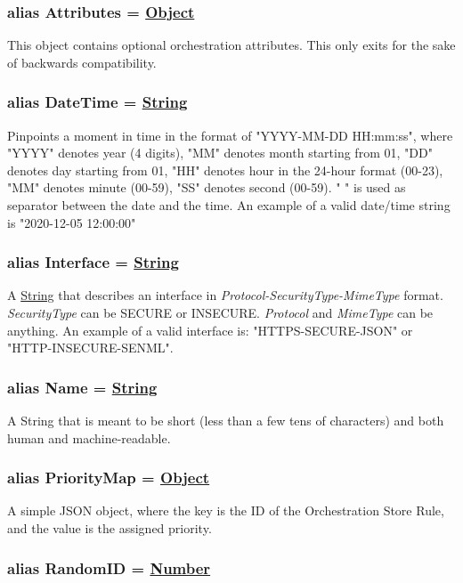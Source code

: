 \documentclass[a4paper]{arrowhead}
\newcommand{\pdef}[1]{{\textcolor{ArrowheadGrey}{#1 \label{sec:model:primitives:#1} \label{sec:model:primitives:#1s}}}}
\newcommand{\pref}[1]{{\textcolor{ArrowheadGrey}{\hyperref[sec:model:primitives:#1]{#1}}}}
\begin{document}
\subsubsection{alias \pdef{Attributes} = \pref{Object}}

This object contains optional orchestration attributes. This only exits for the sake of backwards compatibility.

\subsubsection{alias \pdef{DateTime} = \pref{String}}

Pinpoints a moment in time in the format of "YYYY-MM-DD HH:mm:ss", where "YYYY" denotes year (4 digits), "MM" denotes month starting from 01, "DD" denotes day starting from 01, "HH" denotes hour in the 24-hour format (00-23), "MM" denotes minute (00-59), "SS" denotes second (00-59). " " is used as separator between the date and the time.
An example of a valid date/time string is "2020-12-05 12:00:00"

\subsubsection{alias \pdef{Interface} = \pref{String}}

A \pref{String} that describes an interface in \textit{Protocol-SecurityType-MimeType} format. \textit{SecurityType} can be SECURE or INSECURE. \textit{Protocol} and \textit{MimeType} can be anything. An example of a valid interface is: "HTTPS-SECURE-JSON" or "HTTP-INSECURE-SENML".

\subsubsection{alias \pdef{Name} = \pref{String}}

A String that is meant to be short (less than a few tens of characters) and both human and machine-readable.

\subsubsection{alias \pdef{PriorityMap} = \pref{Object}}

A simple JSON object, where the key is the ID of the Orchestration Store Rule, and the value is the assigned priority.

\subsubsection{alias \pdef{RandomID} = \pref{Number}}
\end{document}
